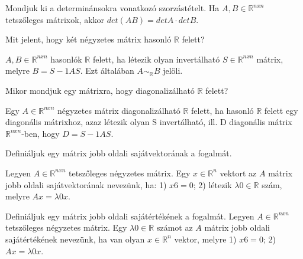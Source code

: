 \begin{frame}
  \begin{tcolorbox}[title={30}]
    Mondjuk ki a determinánsokra vonatkozó szorzástételt.
  \tcblower
    Ha $A,B \in \mathbb{R}^{n x n}$ tetszőleges mátrixok, akkor $det(AB) = detA  \cdot  detB$.
  \end{tcolorbox}
\end{frame}


\begin{frame}
  \begin{tcolorbox}[title={31}]
   Mit jelent, hogy két négyzetes mátrix hasonló $\mathbb{R}$ felett?

  \tcblower
    $A,B \in \mathbb{R}^{n x n}$ hasonlók $\mathbb{R}$ felett, ha létezik olyan invertálható $S \in \mathbb{R}^{n x n}$ mátrix, melyre $B = S-1AS$. Ezt általában $A {\sim}_{\mathbb{R}} B$ jelöli.

  \end{tcolorbox}
\end{frame}


\begin{frame}
  \begin{tcolorbox}[title={32}]
    Mikor mondjuk egy mátrixra, hogy diagonalizálható $\mathbb{R}$ felett?

  \tcblower
    Egy $A \in \mathbb{R}^{n x n}$ négyzetes mátrix diagonalizálható $\mathbb{R}$ felett, ha hasonló $\mathbb{R}$ felett egy diagonális mátrixhoz, azaz létezik olyan S invertálható, ill. D diagonális mátrix $\mathbb{R}^{n x n}$-ben, hogy $D = S-1AS$.

  \end{tcolorbox}
\end{frame}


\begin{frame}
  \begin{tcolorbox}[title={33}]
    Definiáljuk egy mátrix jobb oldali sajátvektorának a fogalmát.

  \tcblower
    Legyen $A \in \mathbb{R}^{n x n}$ tetszőleges négyzetes mátrix. Egy $x \in \mathbb{R}^n$ vektort az $A$ mátrix jobb oldali sajátvektorának nevezünk, ha: 1) $x 6= 0$; 2) létezik ${\lambda}0 \in \mathbb{R}$ szám, melyre $Ax = {\lambda}0x$.

  \end{tcolorbox}
\end{frame}


\begin{frame}
  \begin{tcolorbox}[title={34}]
   Definiáljuk egy mátrix jobb oldali sajátértékének a fogalmát.
  \tcblower
     Legyen $A \in \mathbb{R}^{n x n}$ tetszőleges négyzetes mátrix. Egy ${\lambda}0 \in \mathbb{R}$ számot az $A$ mátrix jobb oldali sajátértékének nevezünk, ha van olyan $x \in \mathbb{R}^n$ vektor, melyre 1) $x 6= 0$; 2) $Ax = {\lambda}0x$.

  \end{tcolorbox}
\end{frame}


